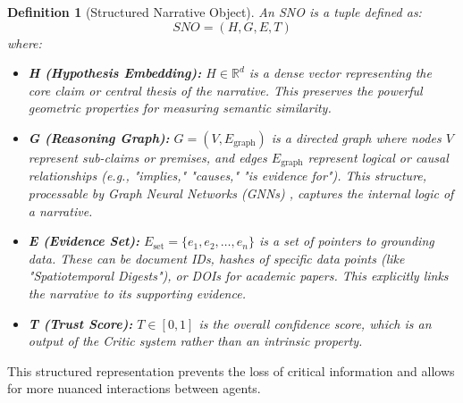 \documentclass[12pt, a4paper]{article}
\newtheorem{definition}{Definition}[section]
\begin{document}
\begin{definition}[Structured Narrative Object]
An SNO is a tuple defined as:
\[ SNO = (H, G, E, T) \]
where:
\begin{itemize}
    \item \textbf{H (Hypothesis Embedding):} $H \in \mathbb{R}^d$ is a dense vector representing the core claim or central thesis of the narrative. This preserves the powerful geometric properties for measuring semantic similarity.
    \item \textbf{G (Reasoning Graph):} $G = (V, E_{\text{graph}})$ is a directed graph where nodes $V$ represent sub-claims or premises, and edges $E_{\text{graph}}$ represent logical or causal relationships (e.g., "implies," "causes," "is evidence for"). This structure, processable by Graph Neural Networks (GNNs) \cite{Kipf2017GCN}, captures the internal logic of a narrative.
    \item \textbf{E (Evidence Set):} $E_{\text{set}} = \{e_1, e_2, \dots, e_n\}$ is a set of pointers to grounding data. These can be document IDs, hashes of specific data points (like "Spatiotemporal Digests"), or DOIs for academic papers. This explicitly links the narrative to its supporting evidence.
    \item \textbf{T (Trust Score):} $T \in [0, 1]$ is the overall confidence score, which is an \textit{output} of the Critic system rather than an intrinsic property.
\end{itemize}
\end{definition}

This structured representation prevents the loss of critical information and allows for more nuanced interactions between agents.
\end{document}
